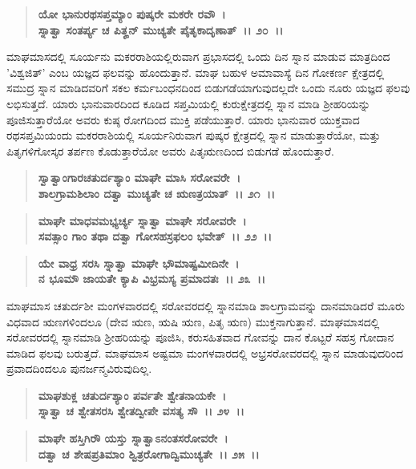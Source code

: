 \begin{verse}
\textbf{ಯೋ ಭಾನುರಥಸಪ್ತಮ್ಯಾಂ ಪುಷ್ಕರೇ ಮಕರೇ ರವೌ~।}\\\textbf{ಸ್ನಾತ್ವಾ ಸಂತರ್ಪ್ಯ ಚ ಪಿತೄನ್ ಮುಚ್ಯತೇ ಪೈತೃಕಾದೃಣಾತ್~।। ೨೦~।।}
\end{verse}

ಮಾಘಮಾಸದಲ್ಲಿ ಸೂರ್ಯನು ಮಕರರಾಶಿಯಲ್ಲಿರುವಾಗ ಪ್ರಭಾಸದಲ್ಲಿ ಒಂದು ದಿನ ಸ್ನಾನ ಮಾಡುವ ಮಾತ್ರದಿಂದ 'ವಿಶ್ವಜಿತ್' ಎಂಬ ಯಜ್ಞದ ಫಲವನ್ನು ಹೊಂದುತ್ತಾನೆ. ಮಾಘ ಬಹುಳ ಅಮಾವಾಸ್ಯೆ ದಿನ ಗೋಕರ್ಣ ಕ್ಷೇತ್ರದಲ್ಲಿ ಸಮುದ್ರ ಸ್ನಾನ ಮಾಡಿದವರಿಗೆ ಸಕಲ ಕರ್ಮಬಂಧನದಿಂದ ಬಿಡುಗಡೆಯಾಗುವುದಲ್ಲದೇ ಒಂದು ನೂರು ಯಜ್ಞದ ಫಲವು ಲಭಿಸುತ್ತದೆ. ಯಾರು ಭಾನುವಾರದಿಂದ ಕೂಡಿದ ಸಪ್ತಮಿಯಲ್ಲಿ ಕುರುಕ್ಷೇತ್ರದಲ್ಲಿ ಸ್ನಾನ ಮಾಡಿ ಶ‍್ರೀಹರಿಯನ್ನು ಪೂಜಿಸುತ್ತಾರೆಯೋ ಅವರು ಕುಷ್ಠ ರೋಗದಿಂದ ಮುಕ್ತಿ ಪಡೆಯುತ್ತಾರೆ. ಯಾರು ಭಾನುವಾರ ಯುಕ್ತವಾದ ರಥಸಪ್ತಮಿಯಂದು ಮಕರರಾಶಿಯಲ್ಲಿ ಸೂರ್ಯನಿರುವಾಗ ಪುಷ್ಕರ ಕ್ಷೇತ್ರದಲ್ಲಿ ಸ್ನಾನ ಮಾಡುತ್ತಾರೆಯೋ, ಮತ್ತು ಪಿತೃಗಳಿಗೋಸ್ಕರ ತರ್ಪಣ ಕೊಡುತ್ತಾರೆಯೋ ಅವರು ಪಿತೃಋಣದಿಂದ ಬಿಡುಗಡೆ ಹೊಂದುತ್ತಾರೆ.

\begin{verse}
\textbf{ಸ್ವಾತ್ವಾಂಗಾರಚತುರ್ದಶ್ಯಾಂ ಮಾಘೇ ಮಾಸಿ ಸರೋವರೇ~।}\\\textbf{ಶಾಲಗ್ರಾಮಶಿಲಾಂ ದತ್ವಾ ಮುಚ್ಯತೇ ಚ ಋಣತ್ರಯಾತ್~।। ೨೧~।। }
\end{verse}

\begin{verse}
\textbf{ಮಾಘೇ ಮಾಧವಮಭ್ಯರ್ಚ್ಯ ಸ್ನಾತ್ವಾ ಮಾಘೇ ಸರೋವರೇ~।}\\\textbf{ಸವತ್ಸಾಂ ಗಾಂ ತಥಾ ದತ್ವಾ ಗೋಸಹಸ್ರಫಲಂ ಭವೇತ್~।। ೨೨~।।} 
\end{verse}

\begin{verse}
\textbf{ಯೇ ವಾಧ್ರ ಸರಸಿ ಸ್ನಾತ್ವಾ ಮಾಘೇ ಭೌಮಾಷ್ಟಮೀದಿನೇ~।}\\\textbf{ನ ಭೂಮೌ ಜಾಯತೇ ಕ್ಯಾಪಿ ವಿಭ್ರಮಸ್ಯ ಪ್ರಮಾದತಃ~।। ೨೩~।।}
\end{verse}

ಮಾಘಮಾಸ ಚತುರ್ದಶೀ ಮಂಗಳವಾರದಲ್ಲಿ ಸರೋವರದಲ್ಲಿ ಸ್ನಾನಮಾಡಿ ಶಾಲಗ್ರಾಮವನ್ನು ದಾನಮಾಡಿದರೆ ಮೂರು ವಿಧವಾದ ಋಣಗಳಿಂದಲೂ (ದೇವ ಋಣ, ಋಷಿ ಋಣ, ಪಿತೃ ಋಣ) ಮುಕ್ತನಾಗುತ್ತಾನೆ. ಮಾಘಮಾಸದಲ್ಲಿ ಸರೋವರದಲ್ಲಿ ಸ್ನಾನಮಾಡಿ ಶ‍್ರೀಹರಿಯನ್ನು ಪೂಜಿಸಿ, ಕರುಸಹಿತವಾದ ಗೋವನ್ನು ದಾನ ಕೊಟ್ಟರೆ ಸಹಸ್ರ ಗೋದಾನ ಮಾಡಿದ ಫಲವು ಬರುತ್ತದೆ. ಮಾಘಮಾಸ ಅಷ್ಟಮಾ ಮಂಗಳವಾರದಲ್ಲಿ ಅಭ್ರಸರೋವರದಲ್ಲಿ ಸ್ನಾನ ಮಾಡುವುದರಿಂದ ಪ್ರವಾದದಿಂದಲೂ ಪುನರ್ಜನ್ಮವಿರುವುದಿಲ್ಲ.

\begin{verse}
\textbf{ಮಾಘಶುಕ್ಲ ಚತುರ್ದಶ್ಯಾಂ ಪರ್ವತೇ ಶ್ವೇತನಾಯಕೇ~।}\\\textbf{ಸ್ನಾತ್ವಾ ಚ ಶ್ವೇತಸರಸಿ ಶ್ವೇತದ್ವೀಪೇ ವಸತ್ಯ ಸೌ~।। ೨೪~।। }
\end{verse}

\begin{verse}
\textbf{ಮಾಘೇ ಹಸ್ತಿಗಿ‌ರೌ ಯಸ್ತು ಸ್ನಾತ್ವಾಽನಂತಸರೋವರೇ~।}\\\textbf{ದತ್ವಾ ಚ ಶೇಷಪ್ರತಿಮಾಂ ಶ್ವಿತ್ರರೋಗಾದ್ವಿಮುಚ್ಯತೇ~।। ೨೫~।।}
\end{verse}

